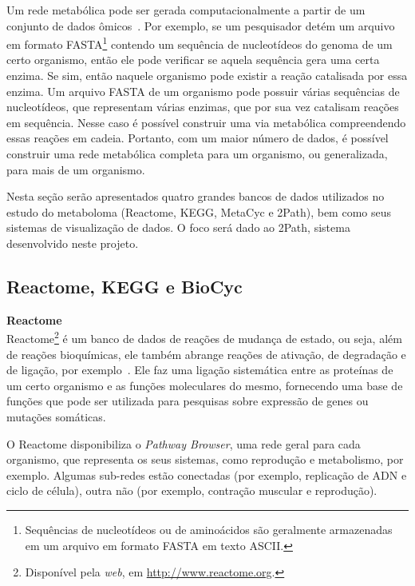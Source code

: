 \indent Um rede metabólica pode ser gerada computacionalmente a partir de um conjunto de dados ômicos~\cite{pireddu06}. Por exemplo, se um pesquisador detém um arquivo em formato FASTA\footnote{Sequências de nucleotídeos ou de aminoácidos são geralmente armazenadas em um arquivo em formato FASTA em texto ASCII.} contendo um sequência de nucleotídeos do genoma de um certo organismo, então ele pode verificar se aquela sequência gera uma certa enzima. Se sim, então naquele organismo pode existir a reação catalisada por essa enzima. Um arquivo FASTA de um organismo pode possuir várias sequências de nucleotídeos, que representam várias enzimas, que por sua vez catalisam reações em sequência. Nesse caso é possível construir uma via metabólica compreendendo essas reações em cadeia. Portanto, com um maior número de dados, é possível construir uma rede metabólica completa para um organismo, ou generalizada, para mais de um organismo.

\indent Nesta seção serão apresentados quatro grandes bancos de dados utilizados no estudo do metaboloma (Reactome, KEGG, MetaCyc e 2Path), bem como seus sistemas de visualização de dados. O foco será dado ao 2Path, sistema desenvolvido neste projeto. 


\subsection{Reactome, KEGG e BioCyc}

\textbf{Reactome} \\

\indent Reactome\footnote{Disponível pela \textit{web}, em \url{http://www.reactome.org}.} é um banco de dados de reações de mudança de estado, ou seja, além de reações bioquímicas, ele também abrange reações de ativação, de degradação e de ligação, por exemplo~\cite{reactomeUsersguide}. Ele faz uma ligação sistemática entre as proteínas de um certo organismo e as funções moleculares do mesmo, fornecendo uma base de funções que pode ser utilizada para pesquisas sobre expressão de genes ou mutações somáticas. 

\indent O Reactome disponibiliza o \textit{Pathway Browser}, uma rede geral para cada organismo, que representa os seus sistemas, como reprodução e metabolismo, por exemplo. Algumas sub-redes estão conectadas (por exemplo, replicação de ADN e ciclo de célula), outra não (por exemplo, contração muscular e reprodução). 


